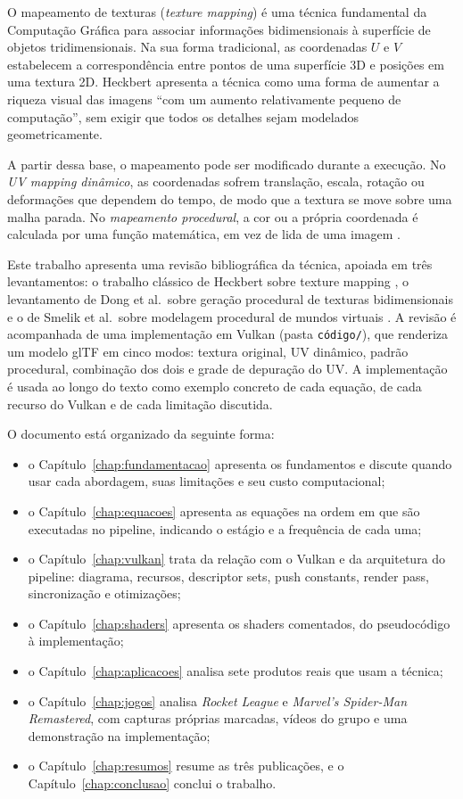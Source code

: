 
O mapeamento de texturas (\textit{texture mapping}) é uma técnica fundamental da Computação Gráfica para associar informações bidimensionais à superfície de objetos tridimensionais. Na sua forma tradicional, as coordenadas \(U\) e \(V\) estabelecem a correspondência entre pontos de uma superfície 3D e posições em uma textura 2D. Heckbert \cite[p.~1]{heckbert1986} apresenta a técnica como uma forma de aumentar a riqueza visual das imagens ``com um aumento relativamente pequeno de computação'', sem exigir que todos os detalhes sejam modelados geometricamente.

A partir dessa base, o mapeamento pode ser modificado durante a execução. No \textit{UV mapping dinâmico}, as coordenadas sofrem translação, escala, rotação ou deformações que dependem do tempo, de modo que a textura se move sobre uma malha parada. No \textit{mapeamento procedural}, a cor ou a própria coordenada é calculada por uma função matemática, em vez de lida de uma imagem \cite[p.~1]{dong2020}.

Este trabalho apresenta uma revisão bibliográfica da técnica, apoiada em três levantamentos: o trabalho clássico de Heckbert sobre texture mapping \cite{heckbert1986}, o levantamento de Dong et al.\ sobre geração procedural de texturas bidimensionais \cite{dong2020} e o de Smelik et al.\ sobre modelagem procedural de mundos virtuais \cite{smelik2014}. A revisão é acompanhada de uma implementação em Vulkan (pasta \texttt{código/}), que renderiza um modelo glTF em cinco modos: textura original, UV dinâmico, padrão procedural, combinação dos dois e grade de depuração do UV. A implementação é usada ao longo do texto como exemplo concreto de cada equação, de cada recurso do Vulkan e de cada limitação discutida.

O documento está organizado da seguinte forma:
\begin{itemize}
    \item o Capítulo~\ref{chap:fundamentacao} apresenta os fundamentos e discute quando usar cada abordagem, suas limitações e seu custo computacional;
    \item o Capítulo~\ref{chap:equacoes} apresenta as equações na ordem em que são executadas no pipeline, indicando o estágio e a frequência de cada uma;
    \item o Capítulo~\ref{chap:vulkan} trata da relação com o Vulkan e da arquitetura do pipeline: diagrama, recursos, descriptor sets, push constants, render pass, sincronização e otimizações;
    \item o Capítulo~\ref{chap:shaders} apresenta os shaders comentados, do pseudocódigo à implementação;
    \item o Capítulo~\ref{chap:aplicacoes} analisa sete produtos reais que usam a técnica;
    \item o Capítulo~\ref{chap:jogos} analisa \textit{Rocket League} e \textit{Marvel's Spider-Man Remastered}, com capturas próprias marcadas, vídeos do grupo e uma demonstração na implementação;
    \item o Capítulo~\ref{chap:resumos} resume as três publicações, e o Capítulo~\ref{chap:conclusao} conclui o trabalho.
\end{itemize}
